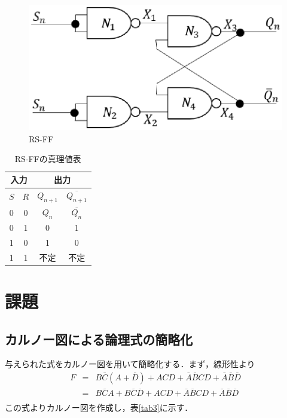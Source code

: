 \documentclass[11pt,a4paper]{jsarticle}
\begin{document}
\begin{figure}[h]
 \begin{center}
  \includegraphics[scale=.7]{./picture/rsff.eps}
  \caption{RS-FF}
\label{fig4}
 \end{center}
\end{figure}

\begin{table}[h]
\centering
 \caption{RS-FFの真理値表}
 \label{tab2}
 \begin{tabular}{|c|c|c|c|} \hline
 \multicolumn{2}{|c|}{入力}& \multicolumn{2}{|c|}{出力} \\ \hline
  $S$ & $R$ & $Q_{n+1}$ & $\overline{Q_{n+1}}$ \\ \hline
    0 &  0  & $Q_n $    & $\overline{Q_n}$     \\ \hline
    0 &  1  &      0    &        1             \\ \hline
    1 &  0  &      1    &        0             \\ \hline
    1 &  1  &     不定  &      不定             \\ \hline
 \end{tabular}
\end{table}

\newpage
\thispagestyle{fancy}
\cfoot{}


\setcounter{section}{4}
\section{課題}
\subsection{カルノー図による論理式の簡略化}
与えられた式をカルノー図を用いて簡略化する．まず，線形性より
\begin{eqnarray*}
F & = & B\bar C(A+\bar D)+ACD+\bar A\bar BCD+\bar A\bar B\bar D \\
  & = & B\bar C A + B\bar C \bar D + ACD + \bar A \bar B CD + \bar A \bar B \bar D \\
\end{eqnarray*}
この式よりカルノー図を作成し，表\ref{tab3}に示す．
\end{document}
